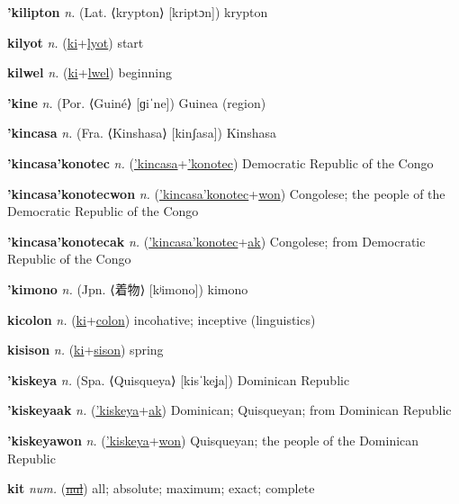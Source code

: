\textbf{\hypertarget{'kilipton}{'kilipton}} \textit{n.} (Lat. ⟨krypton⟩ [kriptɔn])
krypton

\textbf{\hypertarget{kilyot}{kilyot}} \textit{n.} (\hyperlink{ki}{ki}+\allowbreak \hyperlink{lyot}{lyot})
start

\textbf{\hypertarget{kilwel}{kilwel}} \textit{n.} (\hyperlink{ki}{ki}+\allowbreak \hyperlink{lwel}{lwel})
beginning

\textbf{\hypertarget{'kine}{'kine}} \textit{n.} (Por. ⟨Guiné⟩ [ɡiˈne])
Guinea (region)

\textbf{\hypertarget{'kincasa}{'kincasa}} \textit{n.} (Fra. ⟨Kinshasa⟩ [kinʃasa])
Kinshasa

\textbf{\hypertarget{'kincasa'konotec}{'kincasa'konotec}} \textit{n.} (\hyperlink{'kincasa}{'kincasa}+\allowbreak \hyperlink{'konotec}{'konotec})
Democratic Republic of the Congo

\textbf{\hypertarget{'kincasa'konotecwon}{'kincasa'konotecwon}} \textit{n.} (\hyperlink{'kincasa'konotec}{'kincasa'konotec}+\allowbreak \hyperlink{won}{won})
Congolese; the people of the Democratic Republic of the Congo

\textbf{\hypertarget{'kincasa'konotecak}{'kincasa'konotecak}} \textit{n.} (\hyperlink{'kincasa'konotec}{'kincasa'konotec}+\allowbreak \hyperlink{ak}{ak})
Congolese; from Democratic Republic of the Congo

\textbf{\hypertarget{'kimono}{'kimono}} \textit{n.} (Jpn. ⟨{\japanese{}着物}⟩ [kʲimono])
kimono

\textbf{\hypertarget{kicolon}{kicolon}} \textit{n.} (\hyperlink{ki}{ki}+\allowbreak \hyperlink{colon}{colon})
incohative; inceptive (linguistics)

\textbf{\hypertarget{kisison}{kisison}} \textit{n.} (\hyperlink{ki}{ki}+\allowbreak \hyperlink{sison}{sison})
spring

\textbf{\hypertarget{'kiskeya}{'kiskeya}} \textit{n.} (Spa. ⟨Quisqueya⟩ [kisˈkeʝa])
Dominican Republic

\textbf{\hypertarget{'kiskeyaak}{'kiskeyaak}} \textit{n.} (\hyperlink{'kiskeya}{'kiskeya}+\allowbreak \hyperlink{ak}{ak})
Dominican; Quisqueyan; from Dominican Republic

\textbf{\hypertarget{'kiskeyawon}{'kiskeyawon}} \textit{n.} (\hyperlink{'kiskeya}{'kiskeya}+\allowbreak \hyperlink{won}{won})
Quisqueyan; the people of the Dominican Republic

\textbf{\hypertarget{kit}{kit}} \textit{num.} (\hyperlink{nul}{\sout{nul}})
all; absolute; maximum; exact; complete

